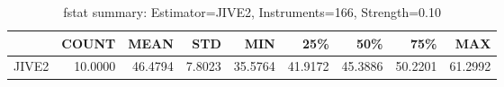 \begin{table}[ht]
\centering
\caption{fstat summary: Estimator=JIVE2, Instruments=166, Strength=0.10}
\begin{tabular}{lrrrrrrrr}
\toprule
 & COUNT & MEAN & STD & MIN & 25\% & 50\% & 75\% & MAX \\
\midrule
JIVE2 & 10.0000 & 46.4794 & 7.8023 & 35.5764 & 41.9172 & 45.3886 & 50.2201 & 61.2992 \\
\bottomrule
\end{tabular}
\end{table}
